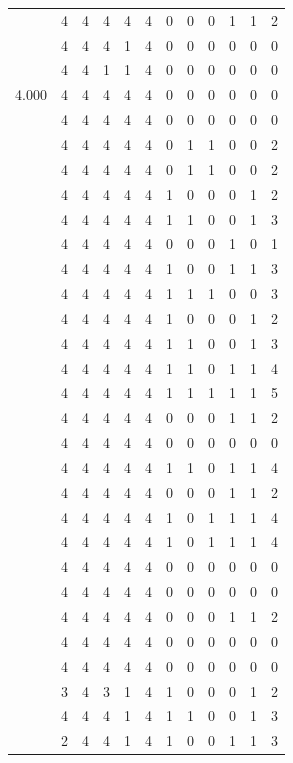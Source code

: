 \documentclass[]{book}
\theoremstyle{definition}
\theoremstyle{definition}
\theoremstyle{definition}
\theoremstyle{remark}
\begin{document}
\begin{table}
{\begin{tabular}[t]{rrrrrrrrrrrr}
 & 4 & 4 & 4 & 4 & 4 & 0 & 0 & 0 & 1 & 1 & 2\\
 & 4 & 4 & 4 & 1 & 4 & 0 & 0 & 0 & 0 & 0 & 0\\
 & 4 & 4 & 1 & 1 & 4 & 0 & 0 & 0 & 0 & 0 & 0\\
4.000 & 4 & 4 & 4 & 4 & 4 & 0 & 0 & 0 & 0 & 0 & 0\\
 & 4 & 4 & 4 & 4 & 4 & 0 & 0 & 0 & 0 & 0 & 0\\
 & 4 & 4 & 4 & 4 & 4 & 0 & 1 & 1 & 0 & 0 & 2\\
 & 4 & 4 & 4 & 4 & 4 & 0 & 1 & 1 & 0 & 0 & 2\\
 & 4 & 4 & 4 & 4 & 4 & 1 & 0 & 0 & 0 & 1 & 2\\
 & 4 & 4 & 4 & 4 & 4 & 1 & 1 & 0 & 0 & 1 & 3\\
 & 4 & 4 & 4 & 4 & 4 & 0 & 0 & 0 & 1 & 0 & 1\\
 & 4 & 4 & 4 & 4 & 4 & 1 & 0 & 0 & 1 & 1 & 3\\
 & 4 & 4 & 4 & 4 & 4 & 1 & 1 & 1 & 0 & 0 & 3\\
 & 4 & 4 & 4 & 4 & 4 & 1 & 0 & 0 & 0 & 1 & 2\\
 & 4 & 4 & 4 & 4 & 4 & 1 & 1 & 0 & 0 & 1 & 3\\
 & 4 & 4 & 4 & 4 & 4 & 1 & 1 & 0 & 1 & 1 & 4\\
 & 4 & 4 & 4 & 4 & 4 & 1 & 1 & 1 & 1 & 1 & 5\\
 & 4 & 4 & 4 & 4 & 4 & 0 & 0 & 0 & 1 & 1 & 2\\
 & 4 & 4 & 4 & 4 & 4 & 0 & 0 & 0 & 0 & 0 & 0\\
 & 4 & 4 & 4 & 4 & 4 & 1 & 1 & 0 & 1 & 1 & 4\\
 & 4 & 4 & 4 & 4 & 4 & 0 & 0 & 0 & 1 & 1 & 2\\
 & 4 & 4 & 4 & 4 & 4 & 1 & 0 & 1 & 1 & 1 & 4\\
 & 4 & 4 & 4 & 4 & 4 & 1 & 0 & 1 & 1 & 1 & 4\\
 & 4 & 4 & 4 & 4 & 4 & 0 & 0 & 0 & 0 & 0 & 0\\
 & 4 & 4 & 4 & 4 & 4 & 0 & 0 & 0 & 0 & 0 & 0\\
 & 4 & 4 & 4 & 4 & 4 & 0 & 0 & 0 & 1 & 1 & 2\\
 & 4 & 4 & 4 & 4 & 4 & 0 & 0 & 0 & 0 & 0 & 0\\
 & 4 & 4 & 4 & 4 & 4 & 0 & 0 & 0 & 0 & 0 & 0\\
 & 3 & 4 & 3 & 1 & 4 & 1 & 0 & 0 & 0 & 1 & 2\\
 & 4 & 4 & 4 & 1 & 4 & 1 & 1 & 0 & 0 & 1 & 3\\
 & 2 & 4 & 4 & 1 & 4 & 1 & 0 & 0 & 1 & 1 & 3\\

\end{tabular}}
\end{table}
\end{document}
